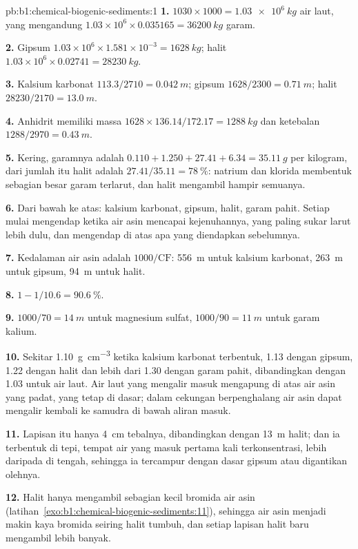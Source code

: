 \begin{solution}{pb:b1:chemical-biogenic-sediments:1}
\textbf{1.} $1030\times1000 = \qty{1.03e6}{kg}$ air laut, yang mengandung
$1.03\times10^6\times0.035165 = \qty{36200}{kg}$ garam.

\textbf{2.} Gipsum $1.03\times10^6\times1.581\times10^{-3} = \qty{1628}{kg}$;
halit $1.03\times10^6\times0.02741 = \qty{28230}{kg}$.

\textbf{3.} Kalsium karbonat $113.3/2710 = \qty{0.042}{m}$; gipsum $1628/2300 =
\qty{0.71}{m}$; halit $28230/2170 = \qty{13.0}{m}$.

\textbf{4.} Anhidrit memiliki massa $1628\times136.14/172.17 =
\qty{1288}{kg}$ dan ketebalan $1288/2970 = \qty{0.43}{m}$.

\textbf{5.} Kering, garamnya adalah $0.110 + 1.250 + 27.41 + 6.34 = \qty{35.11}{g}$ per
kilogram, dari jumlah itu halit adalah $27.41/35.11 = \qty{78}{\%}$: natrium dan klorida
membentuk sebagian besar garam terlarut, dan halit mengambil hampir semuanya.

\textbf{6.} Dari bawah ke atas: kalsium karbonat, gipsum, halit, garam pahit. Setiap
 mulai mengendap ketika air asin mencapai kejenuhannya, yang paling sukar larut
lebih dulu, dan mengendap di atas apa yang diendapkan sebelumnya.

\textbf{7.} Kedalaman air asin adalah $1000/\mathrm{CF}$: \qty{556}{m} untuk kalsium
karbonat, \qty{263}{m} untuk gipsum, \qty{94}{m} untuk halit.

\textbf{8.} $1 - 1/10.6 = \qty{90.6}{\%}$.

\textbf{9.} $1000/70 = \qty{14}{m}$ untuk magnesium sulfat, $1000/90 = \qty{11}{m}$
untuk garam kalium.

\textbf{10.} Sekitar \qty{1.10}{g.cm^{-3}} ketika kalsium karbonat terbentuk, 1.13 dengan
gipsum, 1.22 dengan halit dan lebih dari 1.30 dengan garam pahit, dibandingkan dengan
1.03 untuk air laut. Air laut yang mengalir masuk mengapung di atas air asin yang padat,
yang tetap di dasar; dalam cekungan berpenghalang air asin dapat mengalir kembali ke
samudra di bawah aliran masuk.

\textbf{11.} Lapisan itu hanya \qty{4}{cm} tebalnya, dibandingkan dengan \qty{13}{m}
halit; dan ia terbentuk di tepi, tempat air yang masuk pertama kali terkonsentrasi,
lebih daripada di tengah, sehingga ia tercampur dengan dasar gipsum atau digantikan olehnya.

\textbf{12.} Halit hanya mengambil sebagian kecil bromida air asin (latihan~\ref{exo:b1:chemical-biogenic-sediments:11}), sehingga air asin menjadi makin kaya bromida seiring halit tumbuh, dan setiap lapisan halit baru mengambil lebih banyak.


\end{solution}
